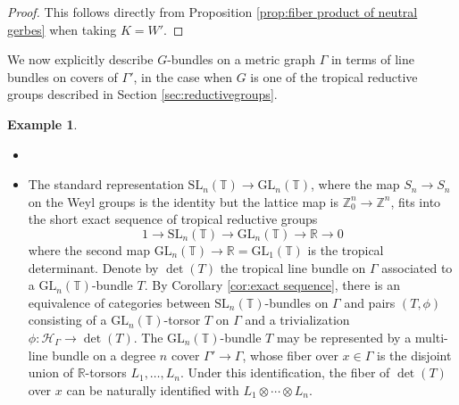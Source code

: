 \documentclass[10pt, a4paper]{amsart}
\theoremstyle{definition}
\newtheorem{example}[theorem]{Example}
\theoremstyle{myitemstyle}
\newcommand{\R}{\mathbb{R}}
\newcommand{\ZZ}{\mathbb{Z}}
\newcommand{\RR}{\mathbb{R}}
\newcommand{\TT}{\mathbb{T}}
\newcommand{\mc}[1]{{\mathcal{#1}}}
\newcommand{\SL}{{\mathrm{SL}}}
\newcommand{\GL}{{\mathrm{GL}}}
\newcommand{\Ga}{\Gamma}
\begin{document}
\begin{proof}
    This follows directly from Proposition \ref{prop:fiber product of neutral gerbes} when taking $K=W'$.
\end{proof}




\label{subsec:Gbundlesviacovers}


We now explicitly describe $G$-bundles on a metric graph $\Ga$ in terms of line bundles on covers of $\Ga'$, in the case when $G$ is one of the tropical reductive groups described in Section \ref{sec:reductivegroups}.


\begin{example}
    \label{exa:bundlescovers}
    \begin{itemize}
    \item[]
        \item [$\SL_n$:] The standard representation $\SL_n(\TT)\to \GL_n(\TT)$, where the map $S_n\to S_n$ on the Weyl groups is the identity but the lattice map is $\ZZ^n_0\to \ZZ^n$, fits into the short exact sequence of tropical reductive groups
        \[
        1 \longrightarrow
            \SL_n(\TT) \longrightarrow 
                \GL_n(\TT) \longrightarrow
                    \RR \longrightarrow
                     0
        \]
        where the second map $\GL_n(\TT)\to \RR=\GL_1(\TT)$ is the tropical determinant. Denote by $\det(T)$ the tropical line bundle on $\Ga$ associated to a $\GL_n(\TT)$-bundle $T$.  By Corollary \ref{cor:exact sequence}, there is an equivalence of categories between $\SL_n(\TT)$-bundles on $\Ga$ and pairs $(T, \phi)$ consisting of a $\GL_n(\TT)$-torsor $T$ on $\Ga$ and a trivialization $\phi:\mc H_\Gamma\to \det(T)$. The $\GL_n(\TT)$-bundle $T$ may be represented by a multi-line bundle on a degree $n$ cover $\Ga'\to \Ga$, whose fiber over $x\in \Gamma$ is the disjoint union of $\R$-torsors $L_1,\ldots, L_n$. Under this identification, the fiber of $\det(T)$ over $x$ can be naturally identified with $L_1\otimes\cdots \otimes L_n$.


\end{itemize}
\end{example}
\end{document}
